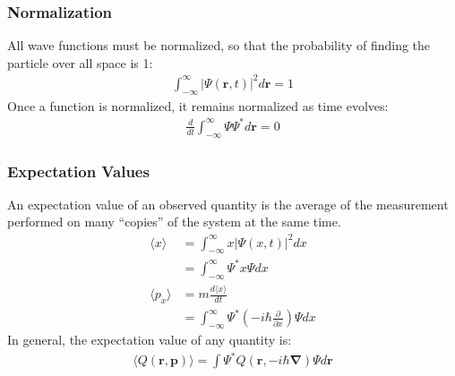 \documentclass[a4paper]{article}
\newcommand{\ve}[1]{
  \ensuremath{\bm{#1}}}	               %
\newcommand{\cc}[1]{
  \ensuremath{#1^{\ast}}}              %
\newcommand{\pd}[2]{
  \ensuremath{
    \frac{\partial #1}{\partial #2} }} %
\newcommand{\ave}[1]{
  \ensuremath{\langle #1 \rangle}}     %
\begin{document}
\begin{multicols*}{2}
\subsubsection{Normalization}
All wave functions must be normalized, so that the probability of finding the
particle over all space is 1:
\begin{align*}
  \int_{-\infty}^{\infty} |\Psi(\ve{r},t)|^2 d\ve{r} = 1
\end{align*}
Once a function is normalized, it remains normalized as time evolves:
\begin{align*}
  \frac{d}{dt} \int_{-\infty}^{\infty} \Psi \cc{\Psi} d\ve{r} = 0
\end{align*}
\subsubsection{Expectation Values}
An expectation value of an observed quantity is the average of the measurement
performed on many ``copies'' of the system at the same time.
\begin{align*}
  \ave{x} &= \int_{-\infty}^{\infty} x |\Psi(x,t)|^2 dx \\
  &= \int_{-\infty}^{\infty} \cc{\Psi} x \Psi dx \\
  \ave{p_x} &= m\frac{d\ave{x}}{dt} \\
  &= \int_{-\infty}^{\infty} \cc{\Psi} \left( -i\hbar \pd{}{x} \right) \Psi dx
\end{align*}
In general, the expectation value of any quantity is:
\begin{align*}
  \ave{Q(\ve{r}, \ve{p})} = \int \cc{\Psi} Q\left(\ve{r}, -i\hbar
    \ve{\nabla} \right) \Psi d\ve{r}
\end{align*}

\end{multicols*}
\end{document}
